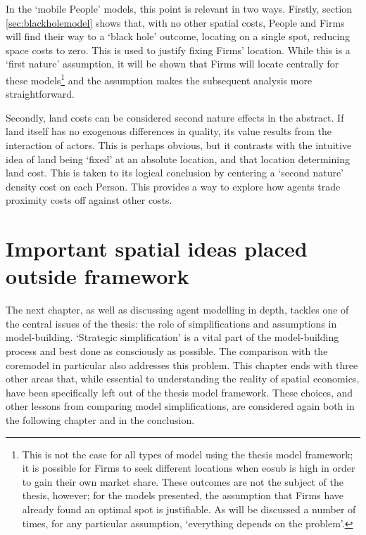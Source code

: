 {In the `mobile People' models, this point is relevant in two ways. Firstly, section \ref{sec:blackholemodel} shows that, with no other spatial costs, People and Firms will find their way to a `black hole' outcome, locating on a single spot, reducing space costs to zero. This is used to justify fixing Firms' location. While this is a `first nature' assumption, it will be shown that Firms will locate centrally for these models\footnote{This is not the case for all types of model using the thesis model framework; it is possible for Firms to seek different locations when \gls{eosub} is high in order to gain their own market share. These outcomes are not the subject of the thesis, however; for the models presented, the assumption that Firms have already found an optimal spot is justifiable. As will be discussed a number of times, for any particular assumption, `everything depends on the problem'.} and the assumption makes the subsequent analysis more straightforward.

Secondly, land costs can be considered second nature effects in the abstract. If land itself has no exogenous differences in quality, its value results from the interaction of actors. This is perhaps obvious, but it contrasts with the intuitive idea of land being `fixed' at an absolute location, and that location determining land cost. This is taken to its logical conclusion by centering a `second nature' density cost on each Person. This provides a way to explore how agents trade proximity costs off against other costs.

\section{Important spatial ideas placed outside framework \label{sec:spacecostissues}}

The next chapter, as well as discussing agent modelling in depth, tackles one of the central issues of the thesis: the role of simplifications and assumptions in model-building. `Strategic simplification' is a vital part of the model-building process and best done as consciously as possible. The comparison with the \gls{coremodel} in particular also addresses this problem. This chapter ends with three other areas that, while essential to understanding the reality of spatial economics, have been specifically left out of the thesis model framework. These choices, and other lessons from comparing model simplifications, are considered again both in the following chapter and in the conclusion.

}
